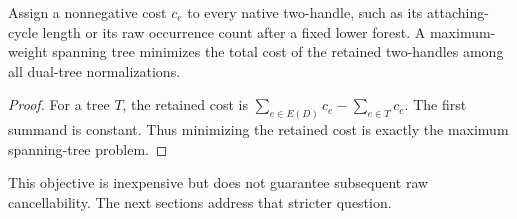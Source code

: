 \begin{proposition}\label{prop:max-tree}
Assign a nonnegative cost $c_e$ to every native two-handle, such as its
attaching-cycle length or its raw occurrence count after a fixed lower
forest.  A maximum-weight spanning tree minimizes the total cost of the
retained two-handles among all dual-tree normalizations.
\end{proposition}
\begin{proof}
For a tree $T$, the retained cost is
$\sum_{e\in E(D)}c_e-\sum_{e\in T}c_e$.  The first summand is constant.
Thus minimizing the retained cost is exactly the maximum spanning-tree
problem.
\end{proof}
This objective is inexpensive but does not guarantee subsequent raw
cancellability.  The next sections address that stricter question.
